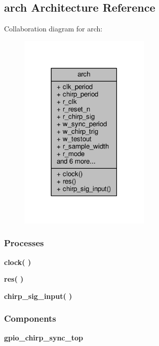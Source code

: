 \subsection{arch Architecture Reference}
\label{classgpio__chirp__sync__top__tb_1_1arch}


Collaboration diagram for arch\+:\nopagebreak
\begin{figure}[H]
\begin{center}
\leavevmode
\includegraphics[width=177pt]{d9/dcf/classgpio__chirp__sync__top__tb_1_1arch__coll__graph}
\end{center}
\end{figure}
\subsubsection*{Processes}
 \begin{DoxyCompactItemize}
\item 
{\bf clock}{\bfseries  (  )}
\item 
{\bf res}{\bfseries  (  )}
\item 
{\bf chirp\+\_\+sig\+\_\+input}{\bfseries  (  )}
\end{DoxyCompactItemize}
\subsubsection*{Components}
 \begin{DoxyCompactItemize}
\item 
{\bf gpio\+\_\+chirp\+\_\+sync\+\_\+top}  {\bfseries }  
\end{DoxyCompactItemize}
